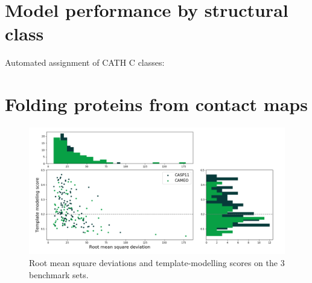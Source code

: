 \section{Model performance by structural class}

  Automated assignment of CATH C classes: 

\section{Folding proteins from contact maps}

    \begin{figure}[H]
        \begin{center}
            \includegraphics[width=\textwidth, keepaspectratio]{imgs/fold.png}
            \caption{Root mean square deviations and template-modelling scores
            on the 3 benchmark sets.}
            \label{fold}
        \end{center}
    \end{figure}

